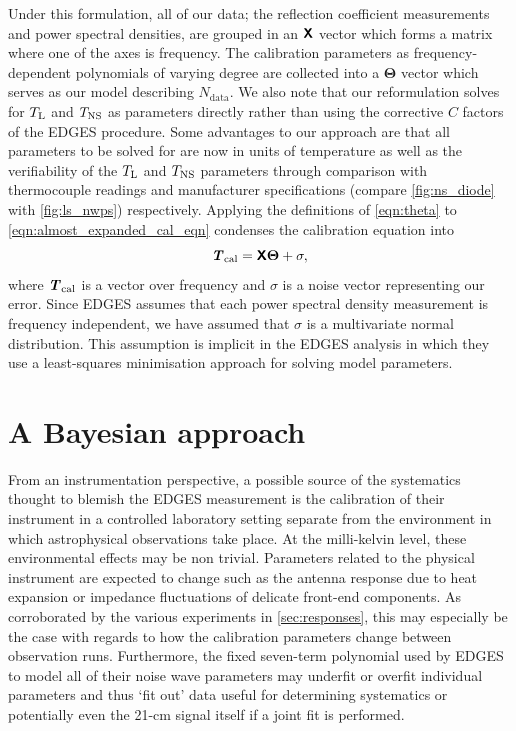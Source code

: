 Under this formulation, all of our data; the reflection coefficient measurements and power spectral densities, are grouped in an $\textbf{\textsf{X}}$ vector which forms a matrix where one of the axes is frequency. The calibration parameters as frequency-dependent polynomials of varying degree are collected into a $\boldsymbol{\Theta}$ vector which serves as our model describing $N_{\mathrm{data}}$. We also note that our reformulation solves for $T_{\mathrm{L}}$ and $T_{\mathrm{NS}}$ as parameters directly rather than using the corrective $C$ factors of the EDGES procedure. Some advantages to our approach are that all parameters to be solved for are now in units of temperature as well as the verifiability of the $T_{\mathrm{L}}$ and $T_{\mathrm{NS}}$ parameters through comparison with thermocouple readings and manufacturer specifications (compare \cref{fig:ns_diode} with \cref{fig:ls_nwps}) respectively. Applying the definitions of \cref{eqn:theta} to \cref{eqn:almost_expanded_cal_eqn} condenses the calibration equation into
\begin{equation}\label{eqn:linearmodel}
    \textbf{\textit{T}}_{\mathrm{cal}} = \textbf{\textsf{X}}\boldsymbol{\Theta}+\sigma,
\end{equation}
where $\textbf{\textit{T}}_{\mathrm{cal}}$ is a vector over frequency and $\sigma$ is a noise vector representing our error. Since EDGES assumes that each power spectral density measurement is frequency independent, we have assumed that $\sigma$ is a multivariate normal distribution. This assumption is implicit in the EDGES analysis in which they use a least-squares minimisation approach for solving model parameters.


\section{A Bayesian approach}\label{sec:bayes}
From an instrumentation perspective, a possible source of the systematics thought to blemish the EDGES measurement is the calibration of their instrument in a controlled laboratory setting separate from the environment in which astrophysical observations take place. At the milli-kelvin level, these environmental effects may be non trivial. Parameters related to the physical instrument are expected to change such as the antenna response due to heat expansion or impedance fluctuations of delicate front-end components. As corroborated by the various experiments in \cref{sec:responses}, this may especially be the case with regards to how the calibration parameters change between observation runs. Furthermore, the fixed seven-term polynomial used by EDGES to model all of their noise wave parameters may underfit or overfit individual parameters and thus `fit out' data useful for determining systematics or potentially even the 21-cm signal itself if a joint fit is performed.


